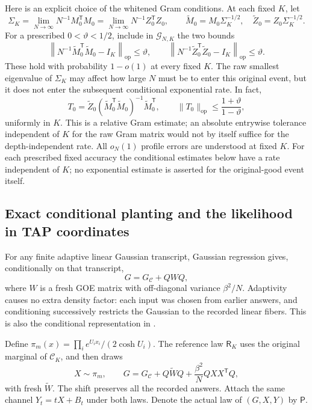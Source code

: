 \documentclass[11pt,reqno]{amsart}
\newcommand{\op}{\operatorname{op}}
\begin{document}
Here is an explicit choice of the
whitened Gram conditions. At each fixed $K$, let
\[
 \Sigma_K=\lim_{N\to\infty}N^{-1}M_0^{\mathsf T}M_0
         =\lim_{N\to\infty}N^{-1}Z_0^{\mathsf T}Z_0,
 \qquad
 \widetilde M_0=M_0\Sigma_K^{-1/2},\quad
 \widetilde Z_0=Z_0\Sigma_K^{-1/2}.
\]
For a prescribed $0<\vartheta<1/2$, include in $\mathcal G_{N,K}$ the
two bounds
\[
 \left\|N^{-1}\widetilde M_0^{\mathsf T}\widetilde M_0-I_K\right\|_{\op}
 \le\vartheta,\qquad
 \left\|N^{-1}\widetilde Z_0^{\mathsf T}\widetilde Z_0-I_K\right\|_{\op}
 \le\vartheta.
\]
These hold with probability $1-o(1)$ at every fixed $K$. The raw
smallest eigenvalue of $\Sigma_K$ may affect how large $N$ must be to
enter this original event, but it does not enter the subsequent
conditional exponential rate. In fact,
\[
 T_0=\widetilde Z_0
       (\widetilde M_0^{\mathsf T}\widetilde M_0)^{-1}
       \widetilde M_0^{\mathsf T},\qquad
 \|T_0\|_{\op}\le\frac{1+\vartheta}{1-\vartheta},
\]
uniformly in $K$. This is a relative Gram estimate; an absolute
entrywise tolerance independent of $K$ for the raw Gram matrix would
not by itself suffice for the depth-independent rate. All $o_N(1)$ profile errors are understood at
fixed $K$. For each prescribed fixed accuracy the conditional estimates
below have a rate independent of $K$; no exponential estimate is
asserted for the original-good event itself.

\subsection{Exact conditional planting and the likelihood in TAP coordinates}
\label{curv:likelihood}

For any finite adaptive linear Gaussian transcript, Gaussian regression
gives, conditionally on that transcript,
\begin{equation}\label{curv:gaussian-regression}
                  G=G_{\mathcal C}+QWQ,
\end{equation}
where $W$ is a fresh GOE matrix with off-diagonal variance $\beta^2/N$.
Adaptivity causes no extra density factor: each input was chosen from
earlier answers, and conditioning successively restricts the Gaussian to
the recorded linear fibers. This is also the conditional representation
in \cite[Appendix A.1]{celentano2024sudakov}.

Define $\pi_m(x)=\prod_i e^{U_ix_i}/(2\cosh U_i)$. The reference law
$\mathsf R_K$ uses the original marginal of $\mathcal C_K$, and then draws
\begin{equation*}
 X\sim\pi_m,\qquad
 G=G_{\mathcal C}+Q\widetilde WQ+\frac{\beta^2}{N}QXX^{\mathsf T}Q,
\end{equation*}
with fresh $\widetilde W$. The shift preserves all the recorded answers.
Attach the same channel $Y_t=tX+B_t$ under both laws. Denote the actual law
of $(G,X,Y)$ by $\mathsf P$.
\end{document}

